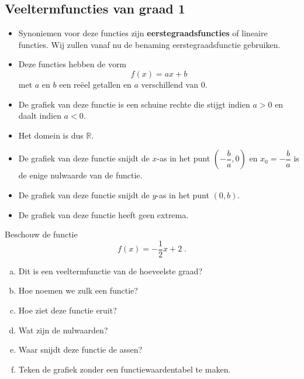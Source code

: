 \documentclass[12pt]{article}
\begin{document}
\subsection{Veeltermfuncties van graad 1}

\begin{itemize}
  \item Synoniemen voor deze functies zijn {\bf eerstegraadsfuncties} of lineaire functies. Wij zullen vanaf nu de benaming eerstegraadsfunctie gebruiken.
  \item Deze functies hebben de vorm
  $$f(x) = ax+b $$
  met $a$ en $b$ een reëel getallen en $a$ verschillend van $0$.
  \item De grafiek van deze functie is een schuine rechte die stijgt indien $a > 0$ en daalt indien $a<0$.
  \item Het domein is dus $\mathbb{R}$.
  \item De grafiek van deze functie snijdt de $x$-as in het punt $(-\dfrac{b}{a}, 0)$ en $x_0=-\dfrac{b}{a}$ is de enige nulwaarde van de functie.
  \item De grafiek van deze functie snijdt de $y$-as in het punt $(0, b)$.
  \item De grafiek van deze functie heeft geen extrema.
\end{itemize}

\begin{oefening}
Beschouw de functie 
$$f(x)=-\dfrac{1}{2}x+2\;.$$
\begin{enumerate}[(a)]
  \item Dit is een veeltermfunctie van de hoeveelste graad?
  \item Hoe noemen we zulk een functie?
  \item Hoe ziet deze functie eruit?
  \item Wat zijn de nulwaarden?
  \item Waar snijdt deze functie de assen?
  \item Teken de grafiek zonder een functiewaardentabel te maken.
\end{enumerate}
\end{oefening}
\end{document}
